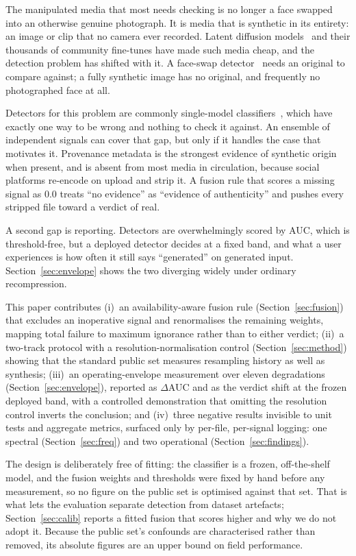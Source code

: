 \documentclass[conference]{IEEEtran}
\begin{document}
The manipulated media that most needs checking is no longer a face swapped into
an otherwise genuine photograph. It is media that is synthetic in its entirety:
an image or clip that no camera ever recorded. Latent diffusion
models~\cite{rombach2022} and their thousands of community fine-tunes have made
such media cheap, and the detection problem has shifted with it. A face-swap
detector~\cite{rossler2019} needs an original to compare against; a fully
synthetic image has no original, and frequently no photographed face at all.

Detectors for this problem are commonly single-model
classifiers~\cite{wang2020,ojha2023,corvi2023}, which have exactly one way to
be wrong and nothing to check it against. An ensemble of independent signals
can cover that gap, but only if it handles the case that motivates it.
Provenance metadata is the strongest evidence of synthetic origin when present,
and is absent from most media in circulation, because social platforms
re-encode on upload and strip it. A fusion rule that scores a missing signal as
$0.0$ treats ``no evidence'' as ``evidence of authenticity'' and pushes every
stripped file toward a verdict of real.

A second gap is reporting. Detectors are overwhelmingly scored by AUC, which is
threshold-free, but a deployed detector decides at a fixed band, and what a
user experiences is how often it still says ``generated'' on generated input.
Section~\ref{sec:envelope} shows the two diverging widely under ordinary
recompression.

This paper contributes (i)~an availability-aware fusion rule
(Section~\ref{sec:fusion}) that excludes an inoperative signal and renormalises
the remaining weights, mapping total failure to maximum ignorance rather than
to either verdict; (ii)~a two-track protocol with a resolution-normalisation
control (Section~\ref{sec:method}) showing that the standard public set
measures resampling history as well as synthesis; (iii)~an operating-envelope
measurement over eleven degradations (Section~\ref{sec:envelope}), reported as
$\Delta$AUC and as the verdict shift at the frozen deployed band, with a
controlled demonstration that omitting the resolution control inverts the
conclusion; and (iv)~three negative results invisible to unit tests and
aggregate metrics, surfaced only by per-file, per-signal logging: one spectral
(Section~\ref{sec:freq}) and two operational (Section~\ref{sec:findings}).

The design is deliberately free of fitting: the classifier is a frozen,
off-the-shelf model, and the fusion weights and thresholds were fixed by hand
before any measurement, so no figure on the public set is optimised against
that set. That is what lets the evaluation separate detection from dataset
artefacts; Section~\ref{sec:calib} reports a fitted fusion that scores higher
and why we do not adopt it. Because the public set's confounds are characterised rather
than removed, its absolute figures are an upper bound on field performance.
\end{document}
